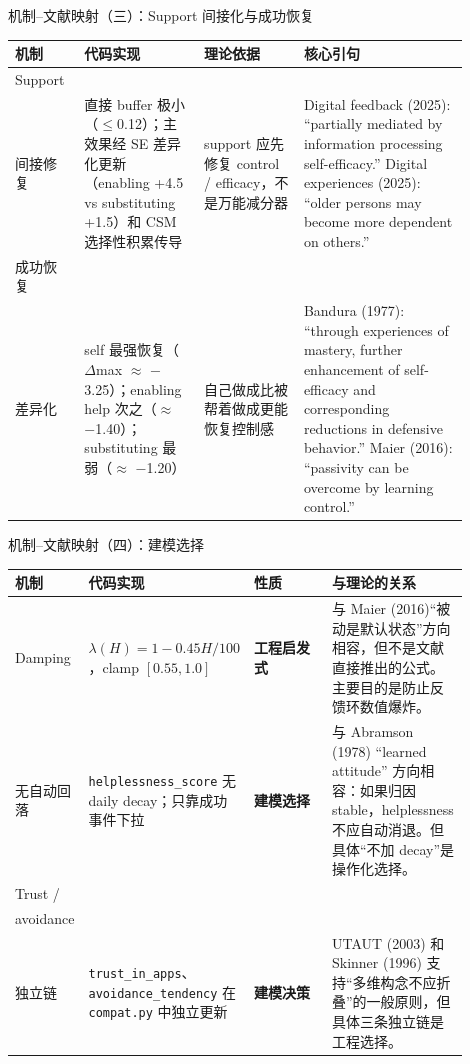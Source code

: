 \documentclass[aspectratio=169]{beamer}
\begin{document}
\begin{frame}[t]{机制--文献映射（三）：Support 间接化与成功恢复}
\scriptsize
\setlength{\tabcolsep}{2.5pt}
\renewcommand{\arraystretch}{1.15}
\centering
\begin{tabular}{
    L{0.13\linewidth}
    L{0.24\linewidth}
    L{0.20\linewidth}
    L{0.33\linewidth}
}
\toprule
\textbf{机制} & \textbf{代码实现} & \textbf{理论依据} & \textbf{核心引句} \\
\midrule
Support\\间接修复
&
直接 buffer 极小（$\leq$0.12）；主效果经 SE 差异化更新（enabling +4.5 vs substituting +1.5）和 CSM 选择性积累传导
&
support 应先修复 control / efficacy，不是万能减分器
&
Digital feedback (2025): ``partially mediated by information processing self-efficacy.'' \newline
Digital experiences (2025): ``older persons may become more dependent on others.'' \\

\midrule
成功恢复\\差异化
&
self 最强恢复（$\Delta$max $\approx$ $-$3.25）；enabling help 次之（$\approx$ $-$1.40）；substituting 最弱（$\approx$ $-$1.20）
&
自己做成比被帮着做成更能恢复控制感
&
Bandura (1977): ``through experiences of mastery, further enhancement of self-efficacy and corresponding reductions in defensive behavior.'' \newline
Maier (2016): ``passivity can be overcome by learning control.'' \\
\bottomrule
\end{tabular}
\end{frame}

\begin{frame}[t]{机制--文献映射（四）：建模选择}
\scriptsize
\setlength{\tabcolsep}{2.5pt}
\renewcommand{\arraystretch}{1.15}
\centering
\begin{tabular}{
    L{0.13\linewidth}
    L{0.24\linewidth}
    L{0.20\linewidth}
    L{0.33\linewidth}
}
\toprule
\textbf{机制} & \textbf{代码实现} & \textbf{性质} & \textbf{与理论的关系} \\
\midrule
Damping
&
$\lambda(H) = 1 - 0.45 H/100$，clamp $[0.55, 1.0]$
&
\textbf{工程启发式}
&
与 Maier (2016)``被动是默认状态''方向相容，但不是文献直接推出的公式。主要目的是防止反馈环数值爆炸。 \\

\midrule
无自动回落
&
\texttt{helplessness\_score} 无 daily decay；只靠成功事件下拉
&
\textbf{建模选择}
&
与 Abramson (1978) ``learned attitude'' 方向相容：如果归因 stable，helplessness 不应自动消退。但具体``不加 decay''是操作化选择。 \\

\midrule
Trust /\\avoidance\\独立链
&
\texttt{trust\_in\_apps}、\texttt{avoidance\_tendency} 在 \texttt{compat.py} 中独立更新
&
\textbf{建模决策}
&
UTAUT (2003) 和 Skinner (1996) 支持``多维构念不应折叠''的一般原则，但具体三条独立链是工程选择。 \\
\bottomrule
\end{tabular}
\end{frame}
\end{document}
